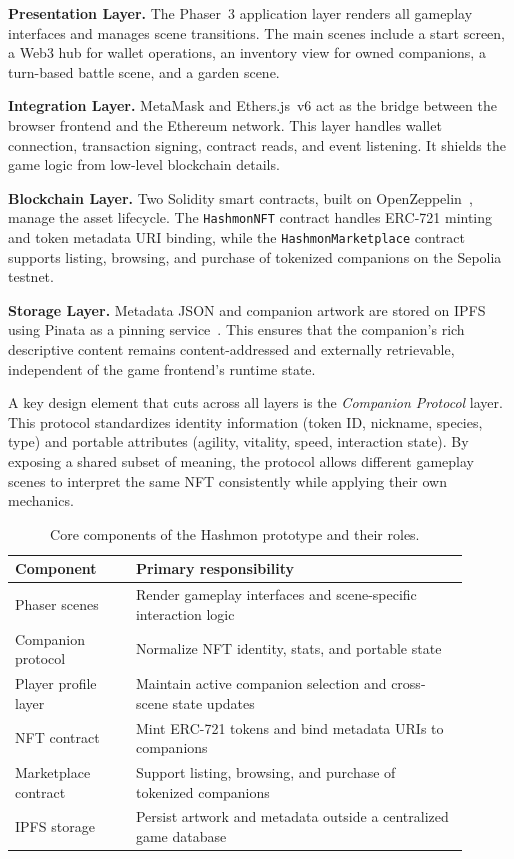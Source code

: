 \documentclass[sigconf]{acmart}
\begin{document}
\textbf{Presentation Layer.} The Phaser~3 application layer renders all gameplay interfaces and manages scene transitions. The main scenes include a start screen, a Web3 hub for wallet operations, an inventory view for owned companions, a turn-based battle scene, and a garden scene.

\textbf{Integration Layer.} MetaMask and Ethers.js~v6 act as the bridge between the browser frontend and the Ethereum network. This layer handles wallet connection, transaction signing, contract reads, and event listening. It shields the game logic from low-level blockchain details.

\textbf{Blockchain Layer.} Two Solidity smart contracts, built on OpenZeppelin~\cite{openzeppelin}, manage the asset lifecycle. The \texttt{HashmonNFT} contract handles ERC-721 minting and token metadata URI binding, while the \texttt{HashmonMarketplace} contract supports listing, browsing, and purchase of tokenized companions on the Sepolia testnet.

\textbf{Storage Layer.} Metadata JSON and companion artwork are stored on IPFS using Pinata as a pinning service~\cite{benet2014ipfs}. This ensures that the companion's rich descriptive content remains content-addressed and externally retrievable, independent of the game frontend's runtime state.

A key design element that cuts across all layers is the \emph{Companion Protocol} layer. This protocol standardizes identity information (token ID, nickname, species, type) and portable attributes (agility, vitality, speed, interaction state). By exposing a shared subset of meaning, the protocol allows different gameplay scenes to interpret the same NFT consistently while applying their own mechanics.

\begin{table}[t]
  \caption{Core components of the Hashmon prototype and their roles.}
  \label{tab:components}
  \centering
  \begin{tabular}{p{0.24\linewidth}p{0.66\linewidth}}
    \toprule
    Component & Primary responsibility \\
    \midrule
    Phaser scenes & Render gameplay interfaces and scene-specific interaction logic \\
    Companion protocol & Normalize NFT identity, stats, and portable state \\
    Player profile layer & Maintain active companion selection and cross-scene state updates \\
    NFT contract & Mint ERC-721 tokens and bind metadata URIs to companions \\
    Marketplace contract & Support listing, browsing, and purchase of tokenized companions \\
    IPFS storage & Persist artwork and metadata outside a centralized game database \\
    \bottomrule
  \end{tabular}
\end{table}
\end{document}
